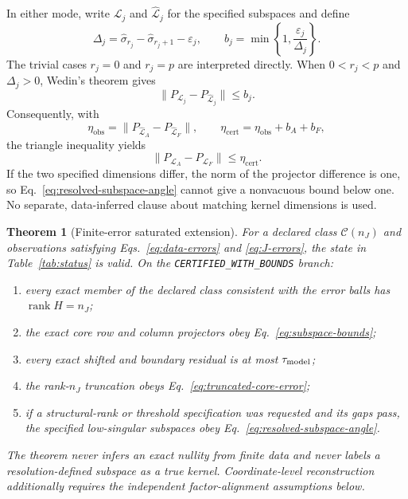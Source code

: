 \documentclass[aps,prl,onecolumn,superscriptaddress,nofootinbib]{revtex4-2}
\newcommand{\rank}{\operatorname{rank}}
\newcommand{\obs}{\mathrm{obs}}
\newcommand{\cert}{\mathrm{cert}}
\newcommand{\eps}{\varepsilon}
\newcommand{\cC}{\mathcal C}
\newtheorem{theorem}{Theorem}
\begin{document}
In either mode, write $\mathcal L_j$ and $\widehat{\mathcal L}_j$ for the specified subspaces and define
\begin{equation}
 \Delta_j=\widehat\sigma_{r_j}-\widehat\sigma_{r_j+1}-\eps_j,
 \qquad
 b_j=\min\left\{1,\frac{\eps_j}{\Delta_j}\right\}.
 \label{eq:response-subspace-gaps}
\end{equation}
The trivial cases $r_j=0$ and $r_j=p$ are interpreted directly.  When $0<r_j<p$ and $\Delta_j>0$, Wedin's theorem gives
\begin{equation}
 \|P_{\mathcal L_j}-P_{\widehat{\mathcal L}_j}\|\le b_j.
 \label{eq:response-subspace-wedin}
\end{equation}
Consequently, with
\begin{equation}
 \eta_{\obs}=\|P_{\widehat{\mathcal L}_A}-P_{\widehat{\mathcal L}_F}\|,
 \qquad
 \eta_{\cert}=\eta_{\obs}+b_A+b_F,
 \label{eq:eta-two-matrix}
\end{equation}
the triangle inequality yields
\begin{equation}
 \|P_{\mathcal L_A}-P_{\mathcal L_F}\|\le\eta_{\cert}.
 \label{eq:resolved-subspace-angle}
\end{equation}
If the two specified dimensions differ, the norm of the projector difference is one, so Eq.~\eqref{eq:resolved-subspace-angle} cannot give a nonvacuous bound below one.  No separate, data-inferred clause about matching kernel dimensions is used.

\begin{theorem}[Finite-error saturated extension]
\label{thm:P}
For a declared class $\cC(n_J)$ and observations satisfying Eqs.~\eqref{eq:data-errors} and \eqref{eq:J-errors}, the state in Table~\ref{tab:status} is valid.  On the \texttt{CERTIFIED\_WITH\_BOUNDS} branch:
\begin{enumerate}
\item every exact member of the declared class consistent with the error balls has $\rank H=n_J$;
\item the exact core row and column projectors obey Eq.~\eqref{eq:subspace-bounds};
\item every exact shifted and boundary residual is at most $\tau_{\rm model}$;
\item the rank-$n_J$ truncation obeys Eq.~\eqref{eq:truncated-core-error};
\item if a structural-rank or threshold specification was requested and its gaps pass, the specified low-singular subspaces obey Eq.~\eqref{eq:resolved-subspace-angle}.
\end{enumerate}
The theorem never infers an exact nullity from finite data and never labels a resolution-defined subspace as a true kernel.  Coordinate-level reconstruction additionally requires the independent factor-alignment assumptions below.
\end{theorem}
\end{document}
